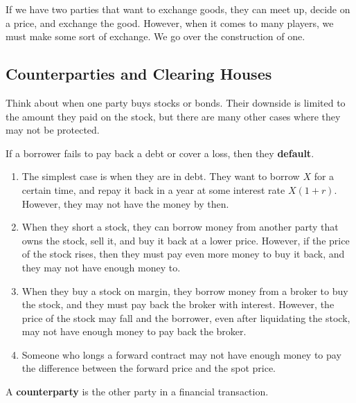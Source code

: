 \documentclass{article}
\begin{document}
  If we have two parties that want to exchange goods, they can meet up, decide on a price, and exchange the good. However, when it comes to many players, we must make some sort of exchange. We go over the construction of one. 

  \subsection{Counterparties and Clearing Houses}

    Think about when one party buys stocks or bonds. Their downside is limited to the amount they paid on the stock, but there are many other cases where they may not be protected. 

    \begin{definition}[Default]
      If a borrower fails to pay back a debt or cover a loss, then they \textbf{default}. 
    \end{definition}

    \begin{example}
      \begin{enumerate}
        \item The simplest case is when they are in debt. They want to borrow $X$ for a certain time, and repay it back in a year at some interest rate $X (1 + r)$. However, they may not have the money by then. 
        \item When they short a stock, they can borrow money from another party that owns the stock, sell it, and buy it back at a lower price. However, if the price of the stock rises, then they must pay even more money to buy it back, and they may not have enough money to. 
        \item When they buy a stock on margin, they borrow money from a broker to buy the stock, and they must pay back the broker with interest. However, the price of the stock may fall and the borrower, even after liquidating the stock, may not have enough money to pay back the broker.
        \item Someone who longs a forward contract may not have enough money to pay the difference between the forward price and the spot price.
      \end{enumerate}
    \end{example}

    \begin{definition}[Counterparty]
      A \textbf{counterparty} is the other party in a financial transaction. 
    \end{definition}
\end{document}
